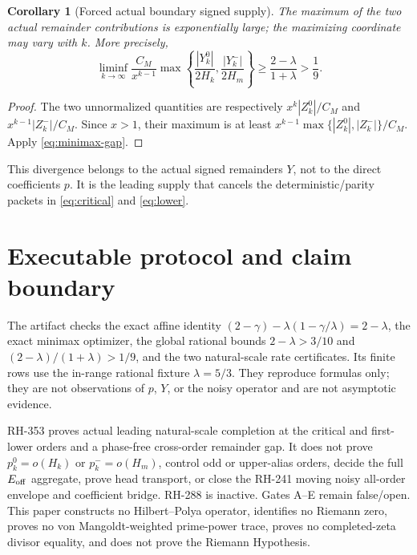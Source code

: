 \documentclass[11pt]{article}
\newtheorem{corollary}[theorem]{Corollary}
\theoremstyle{remark}
\begin{document}
\begin{corollary}[Forced actual boundary signed supply]
\label{cor:supply}
The maximum of the two actual remainder contributions is exponentially large;
the maximizing coordinate may vary with $k$.  More precisely,
\begin{equation}\label{eq:supply}
 \liminf_{k\to\infty}
 \frac{C_M}{x^{k-1}}
 \max\left\{
 \frac{|Y_k^0|}{2H_k},
 \frac{|Y_k^-|}{2H_m}
 \right\}
 \ge\frac{2-\lambda}{1+\lambda}>\frac19.
\end{equation}
\end{corollary}

\begin{proof}
The two unnormalized quantities are respectively
$x^k|Z_k^0|/C_M$ and $x^{k-1}|Z_k^-|/C_M$.  Since $x>1$, their maximum is
at least $x^{k-1}\max\{|Z_k^0|,|Z_k^-|\}/C_M$.  Apply
\eqref{eq:minimax-gap}.
\end{proof}

This divergence belongs to the actual signed remainders $Y$, not to the
direct coefficients $p$.  It is the leading supply that cancels the
deterministic/parity packets in \eqref{eq:critical} and \eqref{eq:lower}.

\section{Executable protocol and claim boundary}

The artifact checks the exact affine identity
$(2-\gamma)-\lambda(1-\gamma/\lambda)=2-\lambda$, the exact minimax
optimizer, the global rational bounds $2-\lambda>3/10$ and
$(2-\lambda)/(1+\lambda)>1/9$, and the two natural-scale rate
certificates.  Its finite rows use the in-range rational fixture
$\lambda=5/3$.  They reproduce formulas only; they are not observations of
$p$, $Y$, or the noisy operator and are not asymptotic evidence.

RH-353 proves actual leading natural-scale completion at the critical and
first-lower orders and a phase-free cross-order remainder gap.  It does not
prove $p_k^0=o(H_k)$ or $p_k^-=o(H_m)$, control odd or upper-alias orders,
decide the full $E_{\rm off}$ aggregate, prove head transport, or close the
RH-241 moving noisy all-order envelope and coefficient bridge.  RH-288 is
inactive.  Gates A--E remain false/open.  This paper constructs no
Hilbert--Polya operator, identifies no Riemann zero, proves no von
Mangoldt-weighted prime-power trace, proves no completed-zeta divisor
equality, and does not prove the Riemann Hypothesis.



\end{document}
